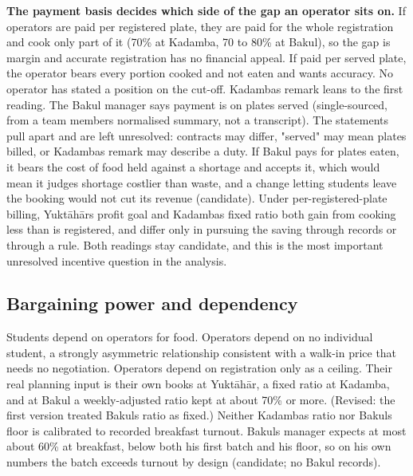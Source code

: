 \documentclass[
  10pt,
  table]{article}
\begin{document}
\begin{enumerate}
  \textbf{The payment basis decides which side of the gap an operator sits on.} If operators are paid per registered plate, they are paid for the whole registration and cook only part of it (70\% at Kadamba, 70 to 80\% at Bakul), so the gap is margin and accurate registration has no financial appeal. If paid per served plate, the operator bears every portion cooked and not eaten and wants accuracy. No operator has stated a position on the cut-off. Kadamba\textquotesingle s remark leans to the first reading. The Bakul manager says payment is on plates served (single-sourced, from a team member\textquotesingle s normalised summary, not a transcript). The statements pull apart and are left unresolved: contracts may differ, "served" may mean plates billed, or Kadamba\textquotesingle s remark may describe a duty. If Bakul pays for plates eaten, it bears the cost of food held against a shortage and accepts it, which would mean it judges shortage costlier than waste, and a change letting students leave the booking would not cut its revenue (candidate). Under per-registered-plate billing, Yuktāhār\textquotesingle s profit goal and Kadamba\textquotesingle s fixed ratio both gain from cooking less than is registered, and differ only in pursuing the saving through records or through a rule. Both readings stay candidate, and this is the most important unresolved incentive question in the analysis.
\end{enumerate}

\subsection{Bargaining power and dependency}\label{bargaining-power-and-dependency}

Students depend on operators for food. Operators depend on no individual student, a strongly asymmetric relationship consistent with a walk-in price that needs no negotiation. Operators depend on registration only as a ceiling. Their real planning input is their own books at Yuktāhār, a fixed ratio at Kadamba, and at Bakul a weekly-adjusted ratio kept at about 70\% or more. (Revised: the first version treated Bakul\textquotesingle s ratio as fixed.) Neither Kadamba\textquotesingle s ratio nor Bakul\textquotesingle s floor is calibrated to recorded breakfast turnout. Bakul\textquotesingle s manager expects at most about 60\% at breakfast, below both his first batch and his floor, so on his own numbers the batch exceeds turnout by design (candidate; no Bakul records).
\end{document}
